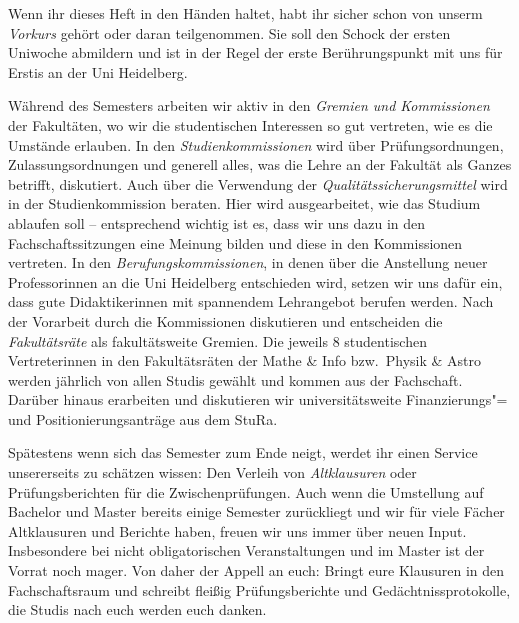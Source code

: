 Wenn ihr dieses Heft in den Händen haltet, habt ihr sicher schon von unserm \emph{Vorkurs} gehört oder daran teilgenommen. Sie soll den Schock der ersten Uniwoche abmildern und ist in der Regel der erste Berührungspunkt mit uns für Erstis an der Uni Heidelberg.


Während des Semesters arbeiten wir aktiv in den \emph{Gremien und Kommissionen} der Fakultäten, wo wir die studentischen Interessen so gut vertreten, wie es die Umstände erlauben. In den \emph{Studienkommissionen} wird über Prüfungsordnungen, Zulassungsordnungen und generell alles, was die Lehre an der Fakultät als Ganzes betrifft, diskutiert. Auch über die Verwendung der \emph{Qualitätssicherungsmittel} wird in der Studienkommission beraten. Hier wird ausgearbeitet, wie das Studium ablaufen soll -- entsprechend wichtig ist es, dass wir uns dazu in den Fachschaftssitzungen eine Meinung bilden und diese in den Kommissionen vertreten. In den \emph{Berufungskommissionen}, in denen über die Anstellung neuer Professorinnen an die Uni Heidelberg entschieden wird, setzen wir uns dafür ein, dass gute Didaktikerinnen mit spannendem Lehrangebot berufen werden. Nach der Vorarbeit durch die Kommissionen diskutieren und entscheiden die \emph{Fakultätsräte} als fakultätsweite Gremien. Die jeweils 8 studentischen Vertreterinnen in den Fakultätsräten der Mathe \& Info bzw.~Physik \& Astro werden jährlich von allen Studis gewählt und kommen aus der Fachschaft. Darüber hinaus erarbeiten und diskutieren wir universitätsweite Finanzierungs"= und Positionierungsanträge aus dem \gls{StuRa}.

Spätestens wenn sich das Semester zum Ende neigt, werdet ihr einen Service unsererseits zu schätzen wissen: Den Verleih von \emph{Altklausuren} oder Prüfungsberichten für die Zwischenprüfungen. Auch wenn die Umstellung auf Bachelor und Master bereits einige Semester zurückliegt und wir für viele Fächer Altklausuren und Berichte haben, freuen wir uns immer über neuen Input. Insbesondere bei nicht obligatorischen Veranstaltungen und im Master ist der Vorrat noch mager. Von daher der Appell an euch: Bringt eure Klausuren in den Fachschaftsraum und schreibt fleißig Prüfungsberichte und Gedächtnissprotokolle, die Studis nach euch werden euch danken.


